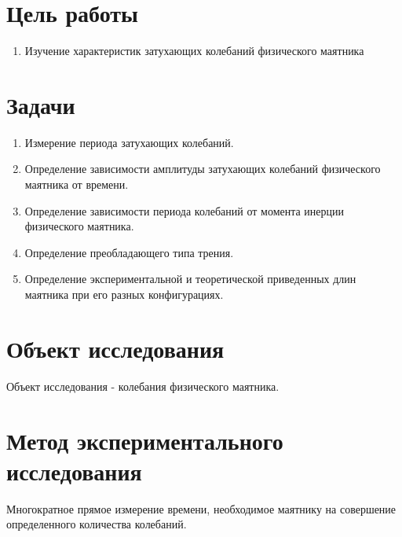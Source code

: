 \section{Цель работы}
\begin{enumerate}
    \item Изучение характеристик затухающих колебаний физического маятника
\end{enumerate}

\section{Задачи}
\begin{enumerate}
    \item Измерение периода затухающих колебаний.
    \item Определение зависимости амплитуды затухающих колебаний физического
        маятника от времени.
    \item Определение зависимости периода колебаний от момента инерции физического
        маятника.
    \item Определение преобладающего типа трения.
    \item Определение экспериментальной и теоретической приведенных длин
        маятника при его разных конфигурациях.
\end{enumerate}

\section{Объект исследования}
Объект исследования - колебания физического маятника.

\section{Метод экспериментального исследования}
Многократное прямое измерение времени, необходимое маятнику на совершение определенного
количества колебаний.

